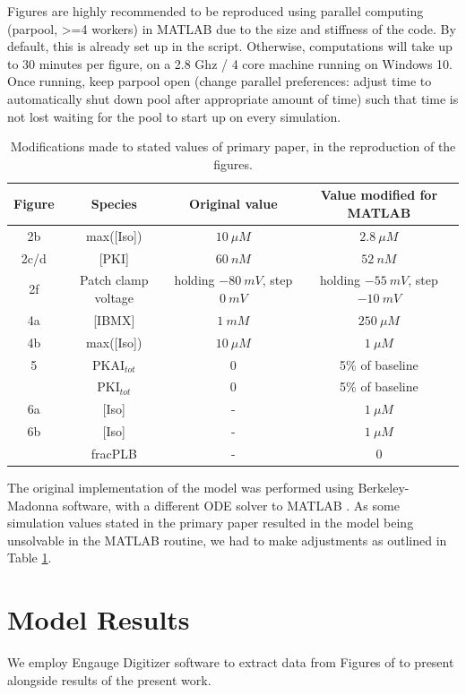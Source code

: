 \documentclass[fleqn,10pt]{physiome}
\begin{document}
Figures are highly recommended to be reproduced using parallel computing (parpool, >=4 workers) in MATLAB due to the size and stiffness of the code. By default, this is already set up in the script. Otherwise, computations will take up to 30 minutes per figure, on a 2.8 Ghz / 4 core machine running on Windows 10.
Once running, keep parpool open (change parallel preferences: adjust time to automatically shut down pool after appropriate amount of time) such that time is not lost waiting for the pool to start up on every simulation.

\begin{table}[]
    \centering
    \begin{tabular}{|c|c|c|c|}
    \hline
         Figure & Species & Original value & Value modified for MATLAB \\
         \hline
         2b & max([Iso]) & $10\ \mu M$ & $2.8\ \mu M$ \\
         2c/d & [PKI] & $60\ nM$ & $52\ nM$ \\
         2f & Patch clamp voltage & holding $-80\ mV$, step $0\ mV$ & holding $-55\ mV$, step $-10\ mV$\\
         4a & [IBMX] & $1\ mM$ & $250\ \mu M$\\
         4b & max([Iso]) & $10\ \mu M$ & $1\ \mu M$ \\
         5 & PKAI$_{tot}$& 0 & 5\% of baseline\\
           & PKI$_{tot}$& 0 & 5\% of baseline\\
         6a & [Iso] & - & $1\ \mu M$ \\
         6b & [Iso] & - & $1\ \mu M$ \\
            & fracPLB & - & 0 \\
        \hline
    \end{tabular}
    \caption{Modifications made to stated values of primary paper, in the reproduction of the figures.}
    \label{tab:parameterAdjustments}
\end{table}
The original implementation of the model was performed using Berkeley-Madonna software, with a different ODE solver to MATLAB \citep{saucerman2003}. As some simulation values stated in the primary paper resulted in the model being unsolvable in the MATLAB routine, we had to make adjustments as outlined in Table \ref{tab:parameterAdjustments}.

\section{Model Results}
We employ Engauge Digitizer software \citep{mark_mitchell_2020_3941227} to extract data from Figures of \cite{saucerman2003} to present alongside results of the present work.
\end{document}
